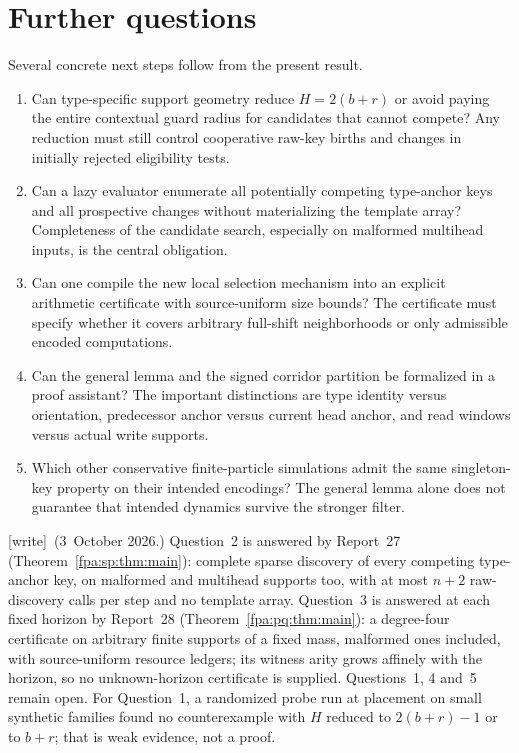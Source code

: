 \documentclass[11pt,a4paper]{article}
\numberwithin{equation}{section}
\newcommand{\wtag}{\textup{[write]}}
\begin{document}
\section{Further questions}\label{fpa:rep:26:last}\label{fpa:pi:sec:questions}
Several concrete next steps follow from the present result.
\begin{enumerate}
\item Can type-specific support geometry reduce $H=2(b+r)$ or avoid paying the entire contextual guard radius for candidates that cannot compete? Any reduction must still control cooperative raw-key births and changes in initially rejected eligibility tests.
\item Can a lazy evaluator enumerate all potentially competing type-anchor keys and all prospective changes without materializing the template array? Completeness of the candidate search, especially on malformed multihead inputs, is the central obligation.
\item Can one compile the new local selection mechanism into an explicit arithmetic certificate with source-uniform size bounds? The certificate must specify whether it covers arbitrary full-shift neighborhoods or only admissible encoded computations.
\item Can the general lemma and the signed corridor partition be formalized in a proof assistant? The important distinctions are type identity versus orientation, predecessor anchor versus current head anchor, and read windows versus actual write supports.
\item Which other conservative finite-particle simulations admit the same singleton-key property on their intended encodings? The general lemma alone does not guarantee that intended dynamics survive the stronger filter.
\end{enumerate}
\wtag\ (3~October 2026.) Question~2 is answered by Report~27 (Theorem~\ref{fpa:sp:thm:main}): complete sparse discovery of every competing type-anchor key, on malformed and multihead supports too, with at most $n+2$ raw-discovery calls per step and no template array. Question~3 is answered at each fixed horizon by Report~28 (Theorem~\ref{fpa:pq:thm:main}): a degree-four certificate on arbitrary finite supports of a fixed mass, malformed ones included, with source-uniform resource ledgers; its witness arity grows affinely with the horizon, so no unknown-horizon certificate is supplied. Questions~1, 4 and~5 remain open. For Question~1, a randomized probe run at placement on small synthetic families found no counterexample with $H$ reduced to $2(b+r)-1$ or to $b+r$; that is weak evidence, not a proof.
\end{document}

